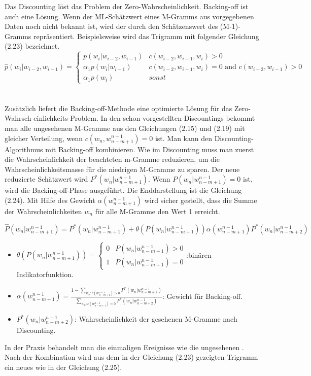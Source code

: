 Das Discounting l\"ost das Problem der Zero-Wahrscheinlichkeit. Backing-off ist auch eine L\"osung. Wenn der ML-Sch\"atzwert eines M-Gramms aus vorgegebenen Daten noch nicht bekannt ist, wird der durch den Sch\"atzenswert des (M-1)-Gramms repr\"asentiert. Beispielsweise wird das Trigramm mit folgender Gleichung (2.23) bezeichnet.
\begin{equation}
\label{equation:backing_off_01}
	\hat{p}(w_{i}|w_{i-2},w_{i-1})=
	\begin{cases}
			p(w_{i}|w_{i-2},w_{i-1}) & c(w_{i-2},w_{i-1},w_{i})>0 \\
			\alpha_{1}p(w_{i}|w_{i-1})& c(w_{i-2},w_{i-1},w_{i})=0 \text{ and } c(w_{i-2},w_{i-1})>0 \\
			\alpha_{1}p(w_{i}) & sonst 
	\end{cases}
\end{equation}
\\
\\
Zus\"atzlich liefert die Backing-off-Methode eine optimierte L\"osung f\"ur das Zero-Wahrsch-einlichkeits-Problem. In den schon vorgestellten Discountings bekommt man alle ungesehenen M-Gramme aus den Gleichungen (2.15) und (2.19) mit gleicher Verteilung, wenn $c(w_{n},w_{n-m+1}^{n-1})=0$ ist. Man kann den Discounting-Algorithmus mit Backing-off kombinieren. Wie im Discounting muss man zuerst die Wahrscheinlichkeit der beachteten m-Gramme reduzieren, um die Wahrscheinlichkeitsmasse f\"ur die niedrigen M-Gramme zu sparen. Der neue  reduzierte Sch\"atzwert wird $P^{*}(w_{n}|w_{n-m+1}^{n-1})$. Wenn $P(w_{n}|w_{n-m+1}^{n-1})=0$ ist, wird die Backing-off-Phase ausgef\"uhrt.  Die Enddarstellung ist die Gleichung (2.24).  Mit  Hilfe des Gewicht $\alpha(w_{n-m+1}^{n-1})$ wird sicher gestellt, dass die Summe der Wahrscheinlichkeiten $w_{n}$ f\"ur alle M-Gramme den Wert 1 erreicht.

\begin{equation}
\label{equation:backing_off_02}
\hat{P}(w_{n}|w_{n-m+1}^{n-1})=P^{*}(w_{n}|w_{n-m+1}^{n-1})+\theta(P(w_{n}|w_{n-m+1}^{n-1}))\alpha(w_{n-m+1}^{n-1})P^{*}(w_{n}|w_{n-m+2}^{n-1})
\end{equation}
\begin{itemize}
	\item $\theta(P(w_{n}|w_{n-m+1}^{n-1}))=\begin{cases} 0 & P(w_{n}|w_{n-m+1}^{n-1})>0 \\ 1 & P(w_{n}|w_{n-m+1}^{n-1})= 0 \end{cases}$:bin\"aren Indikatorfunktion.\\
	\item $\alpha(w_{n-m+1}^{n-1})=\frac{1-\sum_{w_{n}:c(w_{n-m+1}^{n-1})>0}P^{*}(w_{n}|w_{n-m+1}^{n-1})}{\sum_{w_{n}:c(w_{n-m+1}^{n-1})=0}P^{*}(w_{n}|w_{n-m+2}^{n-1})}$: Gewicht f\"ur Backing-off.\\
	\item $P^{*}(w_{n}|w_{n-m+2}^{n-1})$: Wahrscheinlichkeit der gesehenen M-Gramme nach Discounting.
\end{itemize}
In der Praxis behandelt man die einmaligen Ereignisse wie die ungesehenen . Nach der Kombination wird aus dem in der Gleichung (2.23) gezeigten Trigramm ein neues wie in der Gleichung (2.25).

